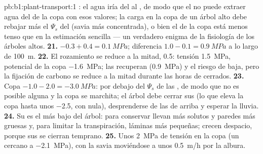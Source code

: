 \begin{solution}{pb:b1:plant-transport:1}
: el agua iría del  al , de modo que el  no puede
extraer agua del  de la copa con esos valores; la carga en la copa de
un árbol alto debe rebajar más el $\Psi_s$ del  (savia más
concentrada), o bien el  de la copa está menos tenso que en la
estimación sencilla --- un verdadero enigma de la fisiología de los árboles
altos.
\textbf{21.} $-0.3 + 0.4 = \qty{0.1}{MPa}$; diferencia $1.0 - 0.1 =
\qty{0.9}{MPa}$ a lo largo de \qty{100}{m}.
\textbf{22.} El rozamiento se reduce a la mitad, \qty{0.5}{}: tensión
\qty{1.5}{MPa}, potencial de la copa \qty{-1.6}{MPa}; las  recuperan
 (\qty{0.9}{MPa}) y el riesgo de  baja, pero la fijación
de carbono se reduce a la mitad durante las horas de  cerrados.
\textbf{23.} Copa $-1.0 - 2.0 = \qty{-3.0}{MPa}$: por debajo del $\Psi_s$ de
las , de modo que no es posible  alguna y la copa se marchita;
el árbol debe cerrar sus  (lo que eleva la copa hasta unos
\qty{-2.5}{}, con  nula), desprenderse de las  de arriba y
esperar la lluvia.
\textbf{24.} Su  es el más bajo del árbol: para conservar
 llevan más solutos y paredes más gruesas y, para limitar la
transpiración, láminas más pequeñas; crecen despacio, porque sus  se
cierran temprano.
\textbf{25.} Unos \qty{2}{MPa} de tensión en la copa (un 
cercano a \qty{-2.1}{MPa}), con la savia moviéndose a unos \qty{0.5}{m/h}
por la albura.
\end{solution}
